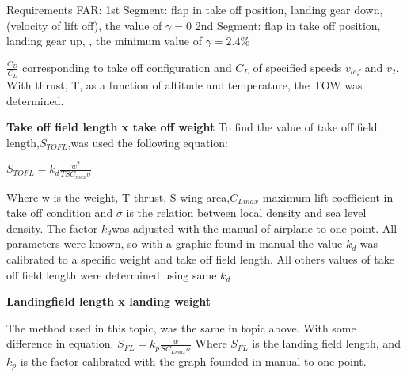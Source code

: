 	Requirements FAR:
	1st Segment: flap in take off position, landing gear down,  (velocity of lift off), the value of $\gamma = 0$
	2nd Segment: flap in take off position, landing gear up,  , the minimum value of $ \gamma = 2.4 \% $
	
	$\frac{C_{D}}{C_{L}}$ corresponding to take off configuration and $C_{L}$ of specified speeds $v_{lof}$ and $v_{2}$.
	With thrust, T, as a function of altitude and temperature, the TOW was determined.
	
\textbf{Take off field length x take off weight}
To find the value of take off field length,$S_{TOFL}$,was used the following equation:

$S_{TOFL} = k_{d}\frac{w^{2}}{TSC_{max}\sigma}$

Where w is the weight, T thrust, S wing area,$C_{Lmax}$  maximum lift coefficient in take off condition and $\sigma$ is the relation between local density and sea level density. The factor $ k_{d} $was adjusted with the manual of airplane to one point. All parameters were known, so with a graphic found in manual the value $k_{d}$ was calibrated to a specific weight and take off field length. All others values of take off field length were determined using same $k_{d}$

\textbf{Landingfield length x landing weight}

The method used in this topic, was the same in topic above. With some difference in equation.
$S_{FL}=k_{p}\frac{w}{SC_{Lmax}\sigma}$
Where $S_{FL}$ is the landing field length, and $k_{p}$  is the factor calibrated with the graph founded in manual to one point.
	
	

	
	
	
	
	


